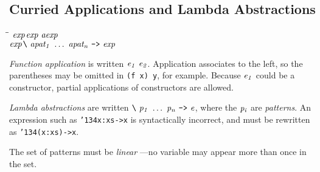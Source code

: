 \subsection{Curried Applications and Lambda Abstractions}
\label{applications}
\label{lambda-abstractions}
%
\begin{flushleft}\it\begin{tabbing}
\hspace{0.5in}\=\hspace{3.0in}\=\kill
$\it exp$\>\makebox[3.5em]{$\rightarrow$}$\it exp\ aexp$\\ 
$\it exp$\>\makebox[3.5em]{$\rightarrow$}$\it \makebox{\tt {\char'134}}\ apat_1\ \ldots \ apat_n\ \makebox{\tt ->}\ exp$
\end{tabbing}\end{flushleft}
%
%
\noindent
{\em Function application} is written 
\mbox{$\it e_1\ e_2$}.  Application associates to the left, so the
parentheses may be omitted in \mbox{\tt (f\ x)\ y}, for example.  Because \mbox{$\it e_1$} could
be a constructor, partial applications of constructors are allowed.

{\em Lambda abstractions} are written 
\mbox{$\it \makebox{\tt {\char'134}}\ p_1\ \ldots \ p_n\ \makebox{\tt ->}\ e$}, where the \mbox{$\it p_i$} are {\em patterns}.
An expression such as \mbox{\tt {\char'134}x:xs->x} is syntactically incorrect,
and must be rewritten as \mbox{\tt {\char'134}(x:xs)->x}.

The set of patterns must be {\em linear}
---no variable may appear more than once in the set.

             
